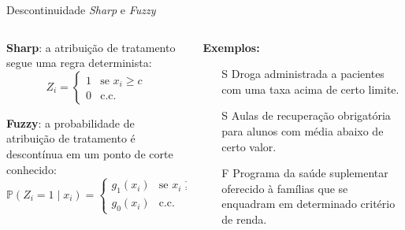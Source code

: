 \documentclass[aspectratio=1610, 10pt]{beamer}
\begin{document}
\begin{frame}{Descontinuidade \emph{Sharp} e \emph{Fuzzy}}
    \vspace{-0.4cm}
	\begin{columns}[T] %
		\begin{column}{0.48\linewidth} %
         \justifying
            \textbf{Sharp}: a atribuição de tratamento segue uma regra determinista:
            \begin{equation*}
                Z_i = \begin{cases}
                    1 & \text{se } x_i \geq c \\
                    0 & \text{c.c.}
                \end{cases}
            \end{equation*}

            \vspace{0.5cm}
            \textbf{Fuzzy}: a probabilidade de atribuição de tratamento é descontínua em um ponto de corte conhecido:
            \begin{equation*}
                \mathbb{P}(Z_i=1 \mid x_i) = \begin{cases}
                    g_1(x_i) & \text{se } x_i \geq c \\
                    g_0(x_i) & \text{c.c.}
                \end{cases}
            \end{equation*}
		\end{column}
		\begin{column}{0.48\linewidth}
            \textbf{Exemplos:}%
            \begin{itemize}
                \item[S] Droga administrada a pacientes com uma taxa acima de certo limite.
                \item[S] Aulas de recuperação obrigatória para alunos com média abaixo de certo valor.
                \item[F] Programa da saúde suplementar oferecido à famílias que se enquadram em determinado critério de renda.
            \end{itemize}
        \end{column}
	\end{columns}
\end{frame}
\end{document}
